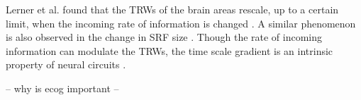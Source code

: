 Lerner et al. found that the TRWs of the brain areas rescale, up to a certain limit, when the incoming rate of information is changed \cite{lerner2014temporal}.
A similar phenomenon is also observed in the change in SRF size \cite{sheinberg2001noticing, furmanski2004learning, moran1985selective}.
Though the rate of incoming information can modulate the TRWs, the time scale gradient is an intrinsic property of neural circuits \cite{stephens2013place}.

-- why is ecog important -- 

